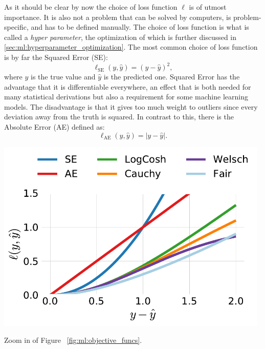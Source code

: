 \documentclass[a4paper, twoside, nobib]{tufte-book}
\newcommand{\abs}[1]{\lvert#1\rvert}
\newcommand{\figref}[1]{Figure ~\ref{#1}}
\begin{document}
As it should be clear by now the choice of loss function $\ell$ is of utmost importance. It is also not a problem that can be solved by computers, is problem-specific, and has to be defined manually. The choice of loss function is what is called a \emph{hyper parameter}, the optimization of which is further discussed in \autoref{sec:ml:hyperparameter_optimization}. The most common choice of loss function is by far the Squared Error (SE): 
\begin{equation}
  \ell_\mathrm{SE}(y, \hat{y}) = \left( y-\hat{y} \right)^2,
\end{equation}
where $y$ is the true value and $\hat{y}$ is the predicted one. Squared Error has the advantage that it is differentiable everywhere, an effect that is both needed for many statistical derivations but also a requirement for some machine learning models. The disadvantage is that it gives too much weight to outliers since every deviation away from the truth is squared. In contrast to this, there is the Absolute Error (AE) defined as:
\begin{equation}
  \ell_\mathrm{AE}(y, \hat{y})  = \abs{y-\hat{y} }.
\end{equation}

\begin{marginfigure}
  \includegraphics[width=0.98\textwidth]{figures/objective_functions/objective_functions_zoom.pdf}
  \caption[Comparison of different objective functions zoom in.]
    {Zoom in of \figref{fig:ml:objective_funcs}. 
    }
  \label{fig:ml:objective_funcs_zoom}
\end{marginfigure}
\end{document}
